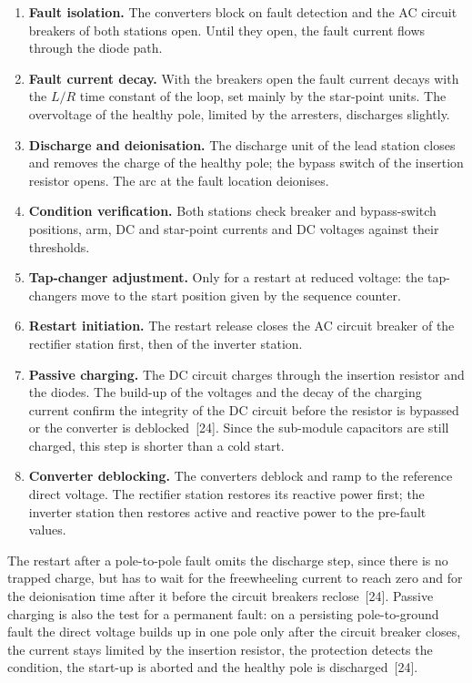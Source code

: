 \begin{enumerate}[itemsep=0.2em]
  \item \textbf{Fault isolation.} The converters block on fault detection
        and the AC circuit breakers of both stations open. Until they open,
        the fault current flows through the diode path.
  \item \textbf{Fault current decay.} With the breakers open the fault
        current decays with the $L/R$ time constant of the loop, set mainly
        by the star-point units. The overvoltage of the healthy pole, limited
        by the arresters, discharges slightly.
  \item \textbf{Discharge and deionisation.} The discharge unit of the lead
        station closes and removes the charge of the healthy pole; the
        bypass switch of the insertion resistor opens. The arc at the fault
        location deionises.
  \item \textbf{Condition verification.} Both stations check breaker and
        bypass-switch positions, arm, DC and star-point currents and DC
        voltages against their thresholds.
  \item \textbf{Tap-changer adjustment.} Only for a restart at reduced
        voltage: the tap-changers move to the start position given by the
        sequence counter.
  \item \textbf{Restart initiation.} The restart release closes the AC
        circuit breaker of the rectifier station first, then of the inverter
        station.
  \item \textbf{Passive charging.} The DC circuit charges through the
        insertion resistor and the diodes. The build-up of the voltages and
        the decay of the charging current confirm the integrity of the DC
        circuit before the resistor is bypassed or the converter is
        deblocked~[24]. Since the sub-module capacitors are still charged,
        this step is shorter than a cold start.
  \item \textbf{Converter deblocking.} The converters deblock and ramp to the
        reference direct voltage. The rectifier station restores its reactive
        power first; the inverter station then restores active and reactive
        power to the pre-fault values.
\end{enumerate}

The restart after a pole-to-pole fault omits the discharge step, since there
is no trapped charge, but has to wait for the freewheeling current to reach
zero and for the deionisation time after it before the circuit breakers
reclose~[24]. Passive charging is also the test for a permanent fault: on a
persisting pole-to-ground fault the direct voltage builds up in one pole
only after the circuit breaker closes, the current stays limited by the
insertion resistor, the protection detects the condition, the start-up is
aborted and the healthy pole is discharged~[24].

